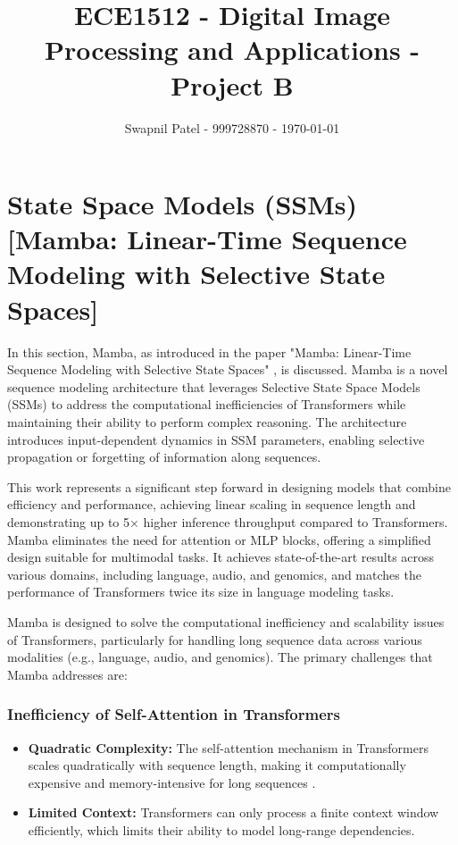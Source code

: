 \documentclass[12pt, conference, compsoc, onecolumn]{IEEEtran}
\begin{document}
	\title{ECE1512 - Digital Image Processing and Applications - Project B}
	\author{Swapnil Patel - 999728870 - \today}
	
	\author{
		}
	
	\maketitle
	
	\section{State Space Models (SSMs) [Mamba: Linear-Time Sequence Modeling with Selective State Spaces]}
	In this section, Mamba, as introduced in the paper "Mamba: Linear-Time Sequence Modeling with Selective State Spaces" \cite{gu2024mamba}, is discussed. Mamba is a novel sequence modeling architecture that leverages Selective State Space Models (SSMs) to address the computational inefficiencies of Transformers while maintaining their ability to perform complex reasoning. The architecture introduces input-dependent dynamics in SSM parameters, enabling selective propagation or forgetting of information along sequences.
	
	This work represents a significant step forward in designing models that combine efficiency and performance, achieving linear scaling in sequence length and demonstrating up to 5× higher inference throughput compared to Transformers. Mamba eliminates the need for attention or MLP blocks, offering a simplified design suitable for multimodal tasks. It achieves state-of-the-art results across various domains, including language, audio, and genomics, and matches the performance of Transformers twice its size in language modeling tasks.
	
	Mamba is designed to solve the computational inefficiency and scalability issues of Transformers, particularly for handling long sequence data across various modalities (e.g., language, audio, and genomics). The primary challenges that Mamba addresses are:
	
	\subsubsection*{Inefficiency of Self-Attention in Transformers}
	\begin{itemize}
		\item \textbf{Quadratic Complexity:} The self-attention mechanism in Transformers scales quadratically with sequence length, making it computationally expensive and memory-intensive for long sequences \cite{vaswani2023attentionneed}.
		\item \textbf{Limited Context:} Transformers can only process a finite context window efficiently, which limits their ability to model long-range dependencies.
	\end{itemize}
	
\end{document}
